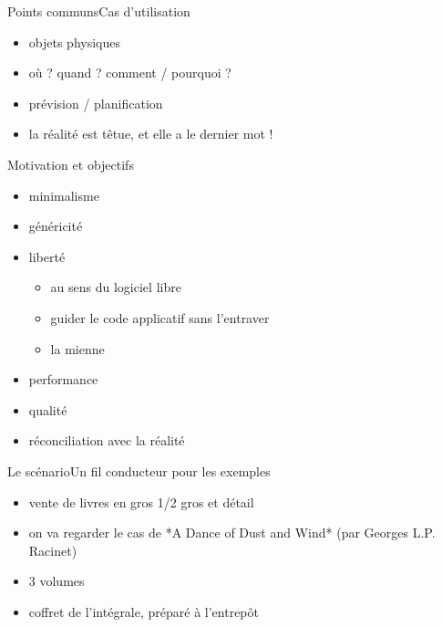 \documentclass{beamer}
\begin{document}
\begin{frame}{Points communs}{Cas d'utilisation}
  \begin{itemize}
    \item<2-> objets physiques
    \item<3-> où ? quand ? comment / pourquoi ?
    \item<4-> prévision / planification
    \item<5-> la réalité est têtue, et elle a le dernier mot !
  \end{itemize}
\end{frame}

\begin{frame}{Motivation et objectifs}
  \begin{itemize}
    \item<2-> minimalisme
    \item<3-> généricité
    \item<4-> liberté
      \begin{itemize}
        \item au sens du logiciel libre
        \item guider le code applicatif sans l'entraver
        \item la mienne
      \end{itemize}
    \item<5-> performance
    \item<6-> qualité
    \item<7-> réconciliation avec la réalité
  \end{itemize}
\end{frame}

\begin{frame}
  {Le scénario}{Un fil conducteur pour les exemples}
  \begin{itemize}
    \item vente de livres en gros 1/2 gros et détail
    \item on va regarder le cas de *A Dance of Dust and Wind* (par Georges L.P.
  Racinet)
    \item 3 volumes
    \item coffret de l'intégrale, préparé à l'entrepôt
  \end{itemize}
\end{frame}
\end{document}
